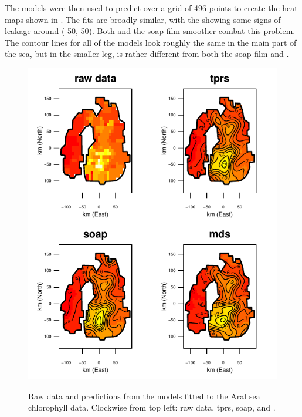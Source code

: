 The models were then used to predict over a grid of 496 points to create the heat maps shown in . The fits are broadly similar, with the \tprs showing some signs of leakage around (-50,-50). Both \mdsap and the soap film smoother combat this problem. The contour lines for all of the models look roughly the same in the main part of the sea, but in the smaller leg, \mdsap is rather different from both the soap film and \tprs.

\begin{figure}
\centering
\includegraphics{mds/figs/aral-fit.pdf} \\
\caption{Raw data and predictions from the models fitted to the Aral sea chlorophyll data. Clockwise from top left: raw data, tprs, soap, and \mdsap.}
\label{aral-fit}
\end{figure}

